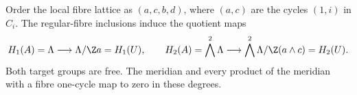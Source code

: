 
\begin{proposition}[P4.3]\hypertarget{tag-02X2}{}\label{night:P4.3}\label{stmt:P4.3}


Order the local fibre lattice as $(a,c,b,d)$, where $(a,c)$ are the cycles
$(1,i)$ in $C_i$. The regular-fibre inclusions induce the quotient maps
\[
 H_1(A)=\Lambda\longrightarrow\Lambda/\Z a=H_1(U),\qquad
 H_2(A)=\bigwedge^2\Lambda\longrightarrow
 \bigwedge^2\Lambda/\Z(a\wedge c)=H_2(U).
\]
Both target groups are free. The meridian and every product of the
meridian with a fibre one-cycle map to zero in these degrees.
\end{proposition}

